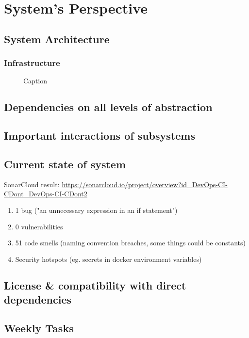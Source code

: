 \section{System's Perspective}

\subsection{System Architecture}
\subsubsection{Infrastructure}

\begin{figure}
    \centering
    \caption{Caption}
    \label{fig:my_label}
\end{figure}
\subsection{Dependencies on all levels of abstraction}
\subsection{Important interactions of subsystems}
\subsection{Current state of system}
SonarCloud result: \url{https://sonarcloud.io/project/overview?id=DevOps-CI-CDont_DevOps-CI-CDont2}
\begin{enumerate}
    \item 1 bug ("an unnecessary expression in an if statement")
    \item 0 vulnerabilities
    \item 51 code smells (naming convention breaches, some things could be constants)
    \item Security hotspots (eg. secrets in docker environment variables)
\end{enumerate}
\subsection{License \& compatibility with direct dependencies}

\subsection{Weekly Tasks}